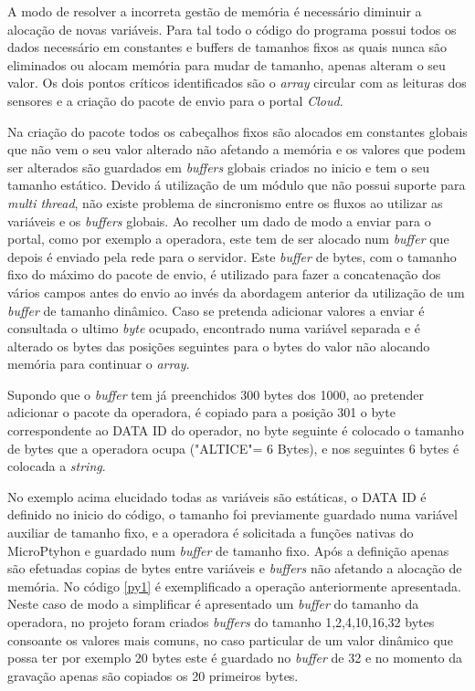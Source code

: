 \par A modo de resolver a incorreta gestão de memória é necessário diminuir a alocação de novas variáveis. Para tal todo o código do programa possui todos os dados necessário em constantes e buffers de tamanhos fixos as quais nunca são eliminados ou alocam memória para mudar de tamanho, apenas alteram o seu valor. Os dois pontos críticos identificados são o \textit{array}  circular com as leituras dos sensores e a criação do pacote de envio para o portal \textit{Cloud}.
\par Na criação do pacote todos os cabeçalhos fixos são alocados em constantes globais que não vem o seu valor alterado não afetando a memória e os valores que podem ser alterados são guardados em \textit{buffers} globais criados no inicio e tem o seu tamanho estático. Devido á utilização de um módulo que não possui suporte para \textit{multi thread}, não existe problema de sincronismo entre os fluxos ao utilizar as variáveis e os \textit{buffers} globais. Ao recolher um dado de modo a enviar para o portal, como por exemplo a operadora, este tem de ser alocado num \textit{buffer} que depois é enviado pela rede para o servidor. Este \textit{buffer} de bytes, com o tamanho fixo do máximo do pacote de envio, é utilizado para fazer a concatenação dos vários campos antes do envio ao invés da abordagem anterior da utilização de um \textit{buffer} de tamanho dinâmico. Caso se pretenda adicionar valores a enviar é consultada o ultimo \textit{byte} ocupado, encontrado numa variável separada e é alterado os bytes das posições seguintes para o bytes do valor não alocando memória para continuar o \textit{array}.
\par Supondo que o \textit{buffer} tem já preenchidos 300 bytes dos 1000, ao pretender adicionar o pacote da operadora, é copiado para a posição 301 o byte correspondente ao DATA ID do operador, no byte seguinte é colocado o tamanho de bytes que a operadora ocupa ("ALTICE"= 6 Bytes), e nos seguintes 6 bytes é colocada a \textit{string}.
\par No exemplo acima elucidado todas as variáveis são estáticas, o DATA ID é definido no inicio do código, o tamanho foi previamente guardado numa variável auxiliar de tamanho fixo, e a operadora é solicitada a funções nativas do MicroPtyhon e guardado num \textit{buffer} de tamanho fixo. Após a definição apenas são efetuadas copias de bytes entre variáveis e \textit{buffers} não afetando a alocação de memória. No código \ref{py1} é exemplificado a operação anteriormente apresentada. Neste caso de modo a simplificar é apresentado um \textit{buffer} do tamanho da operadora, no projeto foram criados \textit{buffers} do tamanho 1,2,4,10,16,32 bytes consoante os valores mais comuns, no caso particular de um valor dinâmico que possa ter por exemplo 20 bytes este é guardado no \textit{buffer} de 32 e no momento da gravação apenas são copiados os 20 primeiros bytes.

